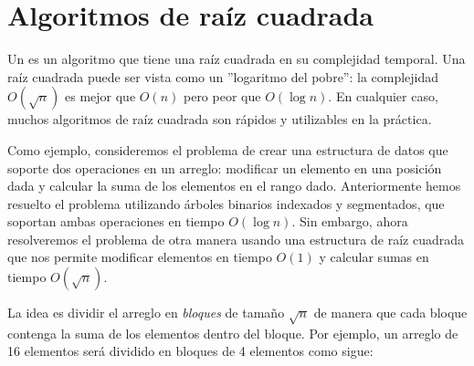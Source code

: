 \chapter{Algoritmos de raíz cuadrada}


Un  es un algoritmo
que tiene una raíz cuadrada en su complejidad temporal.
Una raíz cuadrada puede ser vista como un ''logaritmo del pobre'':
la complejidad $O(\sqrt n)$ es mejor que $O(n)$
pero peor que $O(\log n)$.
En cualquier caso, muchos algoritmos de raíz cuadrada son rápidos y utilizables en la práctica.

Como ejemplo, consideremos el problema de
crear una estructura de datos que soporte
dos operaciones en un arreglo:
modificar un elemento en una posición dada
y calcular la suma de los elementos en el rango dado.
Anteriormente hemos resuelto el problema utilizando
árboles binarios indexados y segmentados,
que soportan ambas operaciones en tiempo $O(\log n)$.
Sin embargo, ahora resolveremos el problema
de otra manera usando una estructura de raíz cuadrada
que nos permite modificar elementos en tiempo $O(1)$
y calcular sumas en tiempo $O(\sqrt n)$.

La idea es dividir el arreglo en \emph{bloques}
de tamaño $\sqrt n$ de manera que cada bloque contenga
la suma de los elementos dentro del bloque.
Por ejemplo, un arreglo de 16 elementos será
dividido en bloques de 4 elementos como sigue:

\begin{center}
\end{center}

